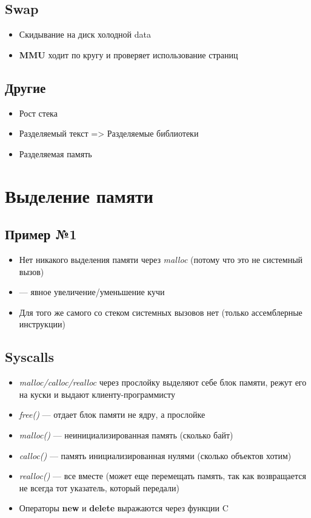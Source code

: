 \documentclass[../../lectures.tex]{subfiles}
\begin{document}
\subsection{Swap}
\begin{itemize}
    \item Скидывание на диск холодной data
    \item \textbf{MMU} ходит по кругу и проверяет использование страниц
\end{itemize}

\subsection{Другие}
\begin{itemize}
    \item Рост стека
    \item Разделяемый текст => Разделяемые библиотеки
    \item Разделяемая память
\end{itemize}

\section{Выделение памяти}
\subsection{Пример №1}


\begin{itemize}
    \item Нет никакого выделения памяти через \emph{malloc} (потому что это не системный вызов)
    \item {} --- явное увеличение/уменьшение кучи
    \item Для того же самого со стеком системных вызовов нет (только ассемблерные инструкции)
\end{itemize}

\subsection{Syscalls}
\begin{itemize}
    \item \emph{malloc/calloc/realloc} через прослойку выделяют себе блок памяти, режут его на куски и выдают клиенту-программисту
    \item \emph{free()} --- отдает блок памяти не ядру, а прослойке
    \item \emph{malloc()} --- неинициализированная память (сколько байт)
    \item \emph{calloc()} --- память инициализированная нулями (сколько объектов хотим)
    \item \emph{realloc()} --- все вместе (может еще перемещать память, 
          так как возвращается не всегда тот указатель, который передали)
    \item Операторы \textbf{new} и \textbf{delete} выражаются через функции C
\end{itemize}
\end{document}
